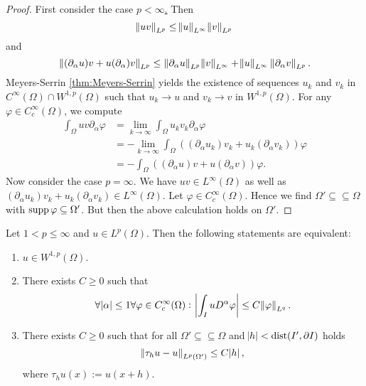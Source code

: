 \begin{proof}
	First consider the case \underline{$p < \infty$.} Then 
	\begin{equation*}
		\norm{uv}_{L^p} \leq \norm{u}_{L^\infty}\norm{v}_{L^p}
	\end{equation*} 
	\noindent and
	\begin{equation*}
		\norm[0]{(\partial_\alpha u) v + u (\partial_\alpha)v}_{L^p} \leq \norm[0]{\partial_\alpha u}_{L^p} \norm{v}_{L^\infty} + \norm{u}_{L^\infty}\norm[0]{\partial_\alpha v}_{L^p}.
	\end{equation*}
	Meyers-Serrin \ref{thm:Meyers-Serrin} yields the existence of sequences $u_k$ and $v_k$ in $C^\infty(\Omega) \cap W^{1,p}(\Omega)$ such that $u_k \to u$ and $v_k \to v$ in $W^{1,p}(\Omega)$. For any $\varphi \in C^\infty_c(\Omega)$, we compute
	\begin{align*}
		\int_\Omega uv \partial_\alpha\varphi &= \lim_{k \to \infty} \int_\Omega u_kv_k \partial_\alpha \varphi\\
		&= - \lim_{k \to \infty} \int_\Omega ((\partial_\alpha u_k)v_k + u_k(\partial_\alpha v_k))\varphi\\
		&= - \int_\Omega ((\partial_\alpha u)v + u(\partial_\alpha v))\varphi.
	\end{align*}
	Now consider the case \underline{$p = \infty$}. We have $uv \in L^\infty(\Omega)$ as well as $(\partial_\alpha u_k)v_k + u_k(\partial_\alpha v_k)\in L^\infty(\Omega)$. Let $\varphi \in C^\infty_c(\Omega)$. Hence we find $\Omega' \subseteq \subseteq \Omega$ with $\operatorname{supp} \varphi \subseteq \Omega'$. But then the above calculation holds on $\Omega'$.
\end{proof}

\begin{theorem}
	Let $1 < p \leq \infty$ and $u \in L^p(\Omega)$. Then the following statements are equivalent:
	\begin{enumerate}[label = \textup{(}\alph*\textup{)},wide = 0pt]
		\item $u \in W^{1,p}(\Omega)$.
		\item There exists $C \geq 0$ such that
			\begin{equation*}
				\forall \abs{\alpha} \leq 1\forall \varphi \in C^\infty_c(\Omega): \> \abs[3]{\int_I uD^\alpha \varphi} \leq C\norm{\varphi}_{L^q}.
			\end{equation*}
		\item There exists $C \geq 0$ such that for all $\Omega' \subseteq \subseteq \Omega$ and $\abs{h} < \operatorname{dist}(I',\partial I)$ holds
			\begin{equation*}
				\norm{\tau_hu - u}_{L^p(\Omega')} \leq C\abs{h},
			\end{equation*}
			\noindent where $\tau_hu(x) := u(x + h)$.
	\end{enumerate}
\end{theorem}

